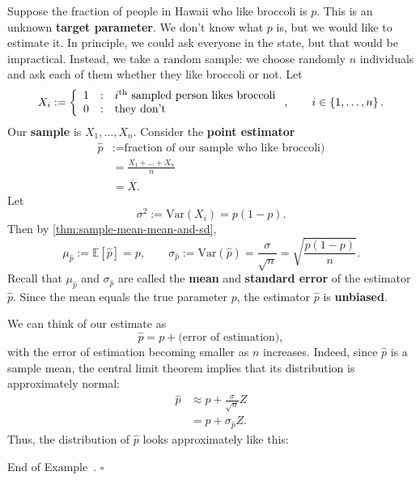 \documentclass[10pt]{article}
\theoremstyle{definition}
\newtheorem{example}[theorem]{Example}
\renewenvironment{example}
{\begin{oldexample}}
  {\par\smallskip\hfill   End of Example~\theexample. $\square$    \par\end{oldexample}}
\newcommand{\1}[1]{\textbf{1}_{\left[#1\right]}} %
\def\E{\mathbb{E}} %
\def\Var{\mathrm{Var}} %
\begin{document}
\begin{example}[Broccoli Poll]
  \label{ex:broccoli-poll}
  Suppose the fraction of people in Hawaii who like broccoli is $p$. This is
  an unknown \textbf{target parameter}. We don't know what $p$ is, but we
  would like to estimate it.  In principle, we could ask everyone in the state,
  but that would be impractical. Instead, we take a random sample: we choose
  randomly $n$ individuals and ask each of them whether they like broccoli or
  not. Let
  \begin{equation*}
    X_{i}  :=\left\{ \begin{array}{l@{\quad:\quad}l} 1 & \text{$i^{\rm th}$ sampled person
          likes broccoli}\\ 0 &\text{they don't} \end{array}\right., \qquad i\in \left\{1,\ldots,n\right\}. 
  \end{equation*}
  Our \textbf{sample} is $X_{1},\ldots,X_{n}$.
  Consider the \textbf{point estimator}
  \begin{align*}
    \widehat{p} 
    &:= \text{fraction of our sample who like broccoli)}\\
    &= \frac{X_{1}+\ldots+X_{n}}{n}\\
    &= \overline{X}.
  \end{align*}
  Let
  \begin{equation*}
    \sigma^{2} := \Var(X_{i}) = p(1-p).
  \end{equation*}
  Then by \cref{thm:sample-mean-mean-and-sd},
  \begin{equation*}
    \mu_{\widehat{p}} := \E[\widehat{p}] = p, \qquad \sigma_{\widehat{p}}:= \Var(\widehat{p}) = \frac{\sigma}{\sqrt{n}} = \sqrt{\frac{p(1-p)}{n}}.
  \end{equation*}
  Recall that $\mu_{\widehat{p}}$ and $\sigma_{\widehat{p}}$ are called the
  \textbf{mean} and \textbf{standard error} of the estimator $\widehat{p}$.
  Since the mean equals the true parameter $p$, the estimator $\widehat{p}$ is \textbf{unbiased}.

  We can think of our estimate as
  \begin{equation*}
    \widehat{p} = p + \text{(error of estimation)},
  \end{equation*}
  with the error of estimation becoming smaller as $n$ increases. Indeed,
  since $\widehat{p}$ is a sample mean, the central limit theorem implies that
  its distribution is approximately normal:
  \begin{align*}
    \widehat{p} 
    &\approx p + \frac{\sigma}{\sqrt{n}}Z \\
    &= p + \sigma_{\widehat{p}}Z.
  \end{align*}
  Thus, the distribution of $\widehat{p}$ looks approximately like this:
  


\end{example}
\end{document}

